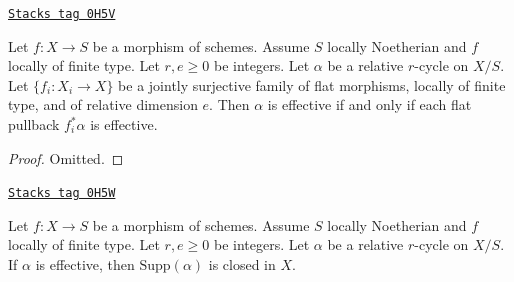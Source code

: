 \begin{lemma}
\label{relative-cycles-lemma-effective-descent-pullbacks}
\href{https://stacks.math.columbia.edu/tag/0H5V}{\texttt{Stacks tag 0H5V}}

Let $f : X \to S$ be a morphism of schemes. Assume $S$ locally Noetherian
and $f$ locally of finite type. Let $r, e \geq 0$ be integers.
Let $\alpha$ be a relative $r$-cycle on $X/S$.
Let $\{f_i : X_i \to X\}$ be a jointly surjective family
of flat morphisms, locally of finite type, and of relative dimension $e$.
Then $\alpha$ is effective if and only if each flat
pullback $f_i^*\alpha$ is effective.
\end{lemma}

\begin{proof}
Omitted.
\end{proof}

\begin{lemma}
\label{relative-cycles-lemma-effective-support-closed}
\href{https://stacks.math.columbia.edu/tag/0H5W}{\texttt{Stacks tag 0H5W}}

Let $f : X \to S$ be a morphism of schemes. Assume $S$ locally Noetherian
and $f$ locally of finite type. Let $r, e \geq 0$ be integers.
Let $\alpha$ be a relative $r$-cycle on $X/S$.
If $\alpha$ is effective, then $\text{Supp}(\alpha)$ is
closed in $X$.
\end{lemma}

